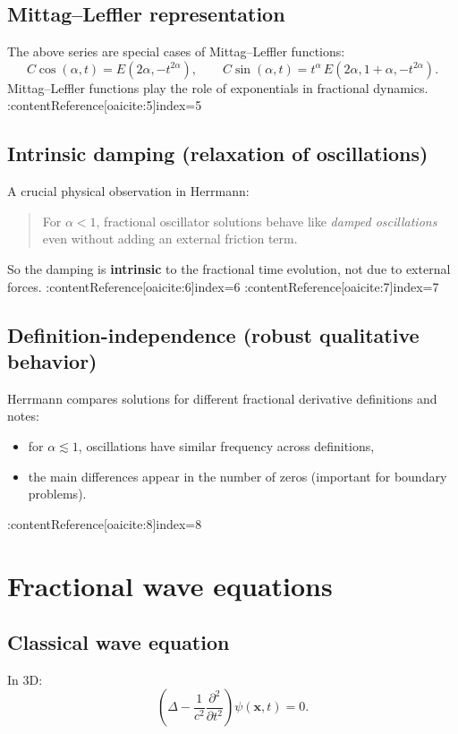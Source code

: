 \subsection{Mittag--Leffler representation}
The above series are special cases of Mittag--Leffler functions:
\begin{equation}
C\cos(\alpha,t)=E(2\alpha,-t^{2\alpha}),
\qquad
C\sin(\alpha,t)=t^\alpha\,E(2\alpha,1+\alpha,-t^{2\alpha}).
\end{equation}
Mittag--Leffler functions play the role of exponentials in fractional dynamics. :contentReference[oaicite:5]{index=5}

\subsection{Intrinsic damping (relaxation of oscillations)}
A crucial physical observation in Herrmann:
\begin{quote}
For $\alpha<1$, fractional oscillator solutions behave like \emph{damped oscillations}
even without adding an external friction term.
\end{quote}
So the damping is \textbf{intrinsic} to the fractional time evolution, not due to external forces. :contentReference[oaicite:6]{index=6} :contentReference[oaicite:7]{index=7}

\subsection{Definition-independence (robust qualitative behavior)}
Herrmann compares solutions for different fractional derivative definitions
and notes:
\begin{itemize}
\item for $\alpha\lesssim 1$, oscillations have similar frequency across definitions,
\item the main differences appear in the number of zeros (important for boundary problems).
\end{itemize}
:contentReference[oaicite:8]{index=8}


\section{Fractional wave equations}

\subsection{Classical wave equation}
In 3D:
\begin{equation}
\left(\Delta - \frac{1}{c^2}\frac{\partial^2}{\partial t^2}\right)\psi(\mathbf{x},t)=0.
\end{equation}

